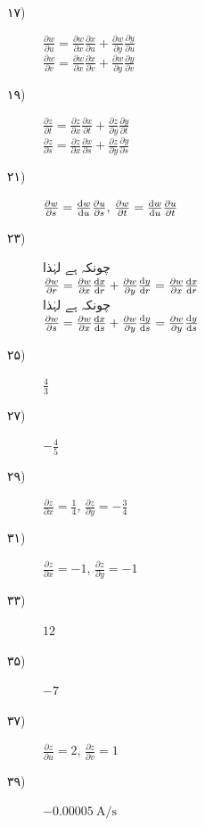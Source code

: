 \begin {description}
\item [
\protect ۱۷)
]
 $\tfrac {\partial w}{\partial u}=\tfrac {\partial w}{\partial x}\tfrac {\partial x}{\partial u}+\tfrac {\partial w}{\partial y}\tfrac {\partial y}{\partial u}$\\ $\tfrac {\partial w}{\partial v}=\tfrac {\partial w}{\partial x}\tfrac {\partial x}{\partial v}+\tfrac {\partial w}{\partial y}\tfrac {\partial y}{\partial v}$ 
\item [
\protect ۱۹)
]
 $\tfrac {\partial z}{\partial t}=\tfrac {\partial z}{\partial x}\tfrac {\partial x}{\partial t}+\tfrac {\partial z}{\partial y}\tfrac {\partial y}{\partial t}$\\ $\tfrac {\partial z}{\partial s}=\tfrac {\partial z}{\partial x}\tfrac {\partial x}{\partial s}+\tfrac {\partial z}{\partial y}\tfrac {\partial y}{\partial s}$ 
\item [
\protect ۲۱)
]
 $\tfrac {\partial w}{\partial s}=\tfrac {\dif w}{\dif u}\tfrac {\partial u}{\partial s},\,\tfrac {\partial w}{\partial t}=\tfrac {\dif w}{\dif u}\tfrac {\partial u}{\partial t}$ 
\item [
\protect ۲۳)
]
 چونکہ  ہے لہٰذا \\ $\tfrac {\partial w}{\partial r}=\tfrac {\partial w}{\partial x}\tfrac {\dif x}{\dif r}+\tfrac {\partial w}{\partial y}\tfrac {\dif y}{\dif r}=\tfrac {\partial w}{\partial x}\tfrac {\dif x}{\dif r}$\\ چونکہ  ہے لہٰذا \\ $\tfrac {\partial w}{\partial s}=\tfrac {\partial w}{\partial x}\tfrac {\dif x}{\dif s}+\tfrac {\partial w}{\partial y}\tfrac {\dif y}{\dif s}=\tfrac {\partial w}{\partial y}\tfrac {\dif y}{\dif s}$ 
\item [
\protect ۲۵)
]
 $\tfrac {4}{3}$ 
\item [
\protect ۲۷)
]
 $-\tfrac {4}{5}$ 
\item [
\protect ۲۹)
]
 $\tfrac {\partial z}{\partial x}=\tfrac {1}{4},\,\tfrac {\partial z}{\partial y}=-\tfrac {3}{4}$ 
\item [
\protect ۳۱)
]
 $\tfrac {\partial z}{\partial x}=-1,\,\tfrac {\partial z}{\partial y}=-1$ 
\item [
\protect ۳۳)
]
 $12$ 
\item [
\protect ۳۵)
]
 $-7$ 
\item [
\protect ۳۷)
]
 $\tfrac {\partial z}{\partial u}=2,\,\tfrac {\partial z}{\partial v}=1$ 
\item [
\protect ۳۹)
]
 $\SI {-0.00005}{\ampere \per \second }$ 

\end{description}
